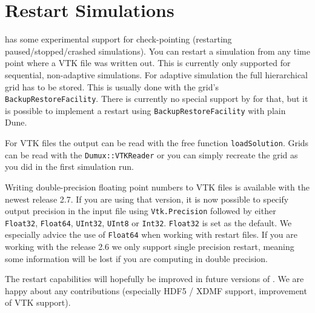 \section{Restart \Dumux Simulations}
\label{sc_restartsimulations}

\Dumux has some experimental support for check-pointing (restarting paused/stopped/crashed simulations).
You can restart a \Dumux simulation from any time point where a VTK file was written out.
This is currently only supported for sequential, non-adaptive simulations. For adaptive simulation
the full hierarchical grid has to be stored. This is usually done with the grid's \texttt{BackupRestoreFacility}.
There is currently no special support by \Dumux for that, but it is possible to implement
a restart using \texttt{BackupRestoreFacility} with plain Dune.

For VTK files the output can be read with the free function \texttt{loadSolution}. Grids can be read with
the \texttt{Dumux::VTKReader} or you can simply recreate the grid as you did in the first simulation run.

Writing double-precision floating point numbers to VTK files is available with the newest \Dune release 2.7. If you are using that version, it is now possible to specify output precision in the input file using \texttt{Vtk.Precision} followed by either \texttt{Float32}, \texttt{Float64}, \texttt{UInt32}, \texttt{UInt8} or \texttt{Int32}. \texttt{Float32} is set as the default. We especially advice the use of \texttt{Float64} when working with restart files. If you are working with the \Dune release 2.6 we only support single precision restart, meaning some information will be lost if you are computing
in double precision.

The restart capabilities will hopefully be improved in future versions of .
We are happy about any contributions (especially HDF5 / XDMF support, improvement of VTK support).
